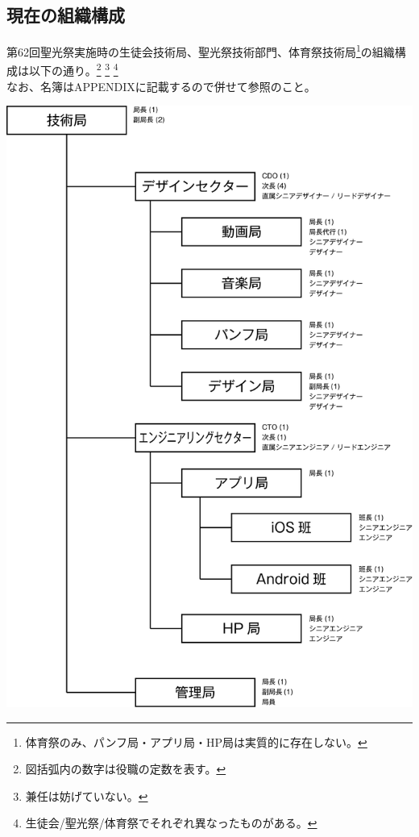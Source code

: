 \documentclass[a4paper]{ltjsreport}
\begin{document}
\subsection{現在の組織構成}
第62回聖光祭実施時の生徒会技術局、聖光祭技術部門、体育祭技術局\footnote{体育祭のみ、パンフ局・アプリ局・HP局は実質的に存在しない。}の組織構成は以下の通り。\footnote{図括弧内の数字は役職の定数を表す。} \footnote{兼任は妨げていない。} \footnote{生徒会/聖光祭/体育祭でそれぞれ異なったものがある。}\\
なお、名簿はAPPENDIXに記載するので併せて参照のこと。


\vspace{5mm}
\includegraphics[scale=0.7]{assets/tech.png}\\
\end{document}

